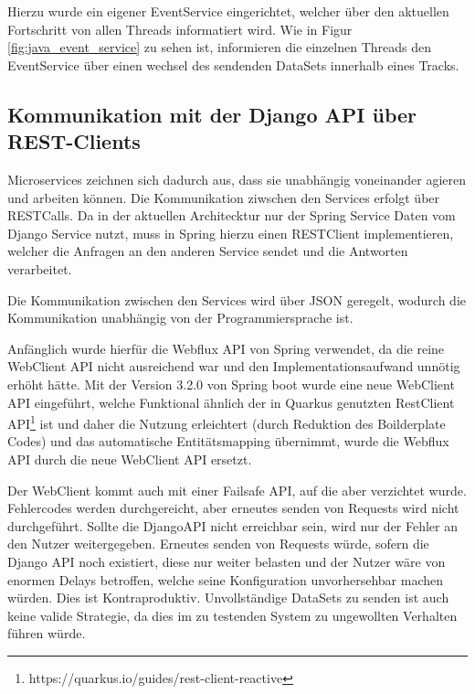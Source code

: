 Hierzu wurde ein eigener EventService eingerichtet, welcher über den aktuellen Fortschritt von allen Threads informatiert wird.
Wie in Figur \ref{fig:java_event_service} zu sehen ist, informieren die einzelnen Threads den EventService über einen wechsel des sendenden DataSets innerhalb eines Tracks.





\subsection{Kommunikation mit der Django API über REST-Clients}
\label{sec:javaRestClient}
Microservices zeichnen sich dadurch aus, dass sie unabhängig voneinander agieren und arbeiten können. Die Kommunikation ziwschen den Services erfolgt über RESTCalls.
Da in der aktuellen Architecktur nur der Spring Service Daten vom Django Service nutzt, muss in Spring hierzu einen RESTClient implementieren, welcher die Anfragen an den anderen Service sendet und die Antworten verarbeitet.

Die Kommunikation zwischen den Services wird über JSON geregelt, wodurch die Kommunikation unabhängig von der Programmiersprache ist.

Anfänglich wurde hierfür die Webflux API von Spring verwendet, da die reine WebClient API nicht ausreichend war und den Implementationsaufwand unnötig erhöht hätte.
Mit der Version 3.2.0 von Spring boot wurde eine neue WebClient API eingeführt, welche Funktional ähnlich der in Quarkus genutzten RestClient API\footnote{https://quarkus.io/guides/rest-client-reactive} ist und daher die Nutzung erleichtert (durch Reduktion des Boilderplate Codes) und das automatische Entitätsmapping übernimmt, wurde die Webflux API durch die neue WebClient API ersetzt.

Der WebClient kommt auch mit einer Failsafe API, auf die aber verzichtet wurde.
Fehlercodes werden durchgereicht, aber erneutes senden von Requests wird nicht durchgeführt. Sollte die DjangoAPI nicht erreichbar sein, wird nur der Fehler an den Nutzer weitergegeben. 
Erneutes senden von Requests würde, sofern die Django API noch existiert, diese nur weiter belasten und der Nutzer wäre von enormen Delays betroffen, welche seine Konfiguration unvorhersehbar machen würden. Dies ist Kontraproduktiv.
Unvollständige DataSets zu senden ist auch keine valide Strategie, da dies im zu testenden System zu ungewollten Verhalten führen würde.
